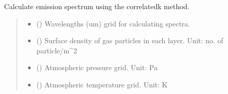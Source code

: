 \documentclass[letterpaper,10pt,english]{sphinxmanual}
\begin{document}

\begin{fulllineitems}
\label{\detokenize{api:nemesispy.calc_radiance}}
\pysigstartsignatures
{}
\pysigstopsignatures
\sphinxAtStartPar
Calculate emission spectrum using the correlated\sphinxhyphen{}k method.
\begin{quote}\begin{description}
\begin{itemize}
\item {} 
\sphinxAtStartPar
{}\sphinxstyleliteralstrong{\sphinxupquote{(}}\sphinxstyleliteralstrong{\sphinxupquote{)}} () \textendash{} Wavelengths (um) grid for calculating spectra.

\item {} 
\sphinxAtStartPar
{}\sphinxstyleliteralstrong{\sphinxupquote{(}}\sphinxstyleliteralstrong{\sphinxupquote{)}} () \textendash{} Surface density of gas particles in each layer.
Unit: no. of particle/m\textasciicircum{}2

\item {} 
\sphinxAtStartPar
{}\sphinxstyleliteralstrong{\sphinxupquote{(}}\sphinxstyleliteralstrong{\sphinxupquote{)}} () \textendash{} Atmospheric pressure grid.
Unit: Pa

\item {} 
\sphinxAtStartPar
{}\sphinxstyleliteralstrong{\sphinxupquote{(}}\sphinxstyleliteralstrong{\sphinxupquote{)}} () \textendash{} Atmospheric temperature grid.
Unit: K


\end{itemize}
\end{description}
\end{quote}
\end{fulllineitems}
\end{document}
